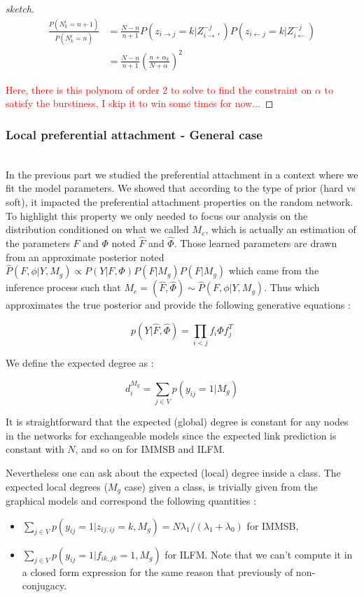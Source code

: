 \documentclass{llncs}
\begin{document}
\begin{proof}[sketch]
\begin{align*}
\frac{P(N_k^i=n+1)}{P(N_k^i=n)} &= \frac{N-n}{n+1}P(z_{i\rightarrow j}=k | Z_{i\rightarrow}^{-j},) P(z_{i\leftarrow j}=k |  Z_{i\leftarrow}^{-j}) \\
&=  \frac{N-n}{n+1} \left( \frac{n + \alpha_k}{N + \alpha_{\bm{.}}}\right)^2
\end{align*}

\textcolor{red}{Here, there is this polynom of order 2 to solve to find the constraint on $\alpha$ to satisfy the burstiness, I skip it to win some times for now...}

 \end{proof}


\subsubsection{Local preferential attachment - General case}~\\

In the previous part we studied the preferential attachment in a context where we fit the model parameters. We showed that according to the type of prior (hard vs soft), it impacted the preferential attachment properties on the random network. To highlight this property we only needed to focus our analysis on the distribution conditioned on what we called $M_e$, which is actually an estimation of the parameters $F$ and $\Phi$ noted $\hat F$ and $\hat \Phi$. Those learned parameters are drawn from an approximate posterior noted $\hat P(F, \phi | Y, M_g) \propto P(Y|F, \Phi)P(F|M_g)P(F|M_g)$ which came from the inference process such that $M_e = (\hat F, \hat \Phi) \sim \hat P(F, \phi | Y, M_g)$. Thus which approximates the true posterior and provide the following generative equations :

\begin{equation}
    p(Y | \hat F, \hat \Phi) = \prod_{i<j} f_i \Phi f_j^T
\end{equation}

We define the expected degree as :

\begin{equation}
d_{i}^{M_g} = \sum_{j\in V} p(y_{ij}=1 | M_g)
\end{equation}

It is straightforward that the expected (global) degree is constant for any nodes in the networks for exchangeable models since  the expected link prediction is constant with $N$, and so on for IMMSB and ILFM. 

Nevertheless one can ask about the  expected (local) degree inside a class. The expected local degrees ($M_g$ case) given a class, is trivially given from the graphical models and correspond the following quantities  :
\begin{itemize}
	\item $\sum_{j\in V} p(y_{ij}=1  | z_{ij, ij}=k, M_g) = N \lambda_1 / (\lambda_1 + \lambda_0)$ for IMMSB,
	\item $\sum_{j\in V} p(y_{ij}=1  | f_{ik, jk}=1, M_g)$  for ILFM. Note that we can't compute it in a closed form expression for the same reason that previously of non-conjugacy.
\end{itemize}
\end{document}
